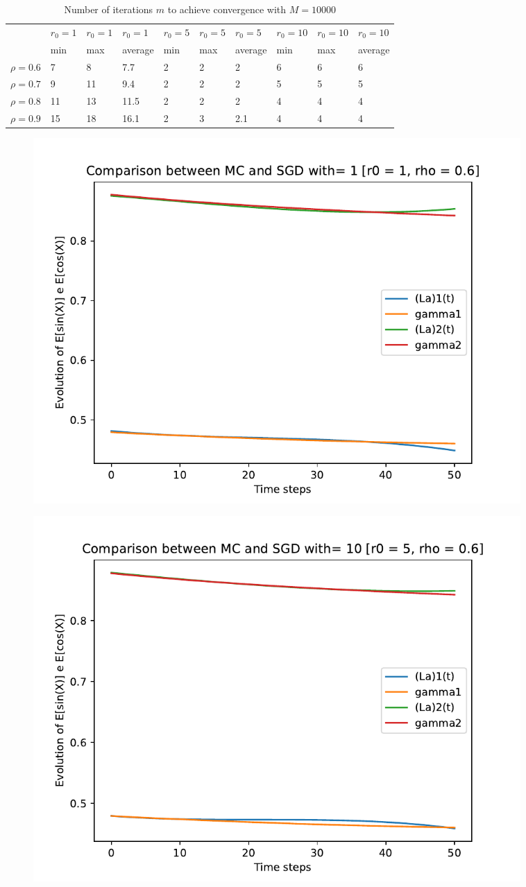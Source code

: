 \documentclass[a4paper,11pt,openright]{report}
\begin{document}
\begin{table}[H]
\centering
\addtolength{\leftskip}{-1.5cm}
\addtolength{\rightskip}{-1.5cm}
\begin{tabular}{|c|lllllllll|}
\hline
$ $ & $r_0 = 1$ & $r_0 = 1$ & $r_0 = 1$ & $r_0 = 5$ & $r_0 = 5$ & $r_0 = 5$ & $r_0 = 10$ & $r_0 = 10$ & $r_0 = 10$  \\
$ $ & min & max & average & min & max & average & min & max & average \\ 
\hline
$\rho = 0.6$ & 7 & 8 & 7.7 & 2 & 2 & 2 & 6 & 6 & 6\\

$\rho = 0.7$ & 9 & 11 & 9.4 & 2 & 2 & 2 & 5 & 5 & 5\\

$\rho = 0.8$ & 11 & 13 & 11.5 & 2 & 2 & 2 & 4 & 4 & 4\\

$\rho = 0.9$ & 15 & 18 & 16.1 & 2 & 3 & 2.1 & 4 & 4 & 4\\
\hline
\end{tabular}
\caption{Number of iterations $m$ to achieve convergence with $M = 10000$}
\end{table}
\begin{figure}[H]
\centering
\includegraphics[width=0.9\textwidth]{images/graphs T = 0.5/n = 3, M = 1 sine and cosine.pdf}
\end{figure}
\begin{figure}[H]
\centering
\includegraphics[width=0.9\textwidth]{images/graphs T = 0.5/n = 3, M = 10 sine and cosine.pdf}
\end{figure}
\end{document}

